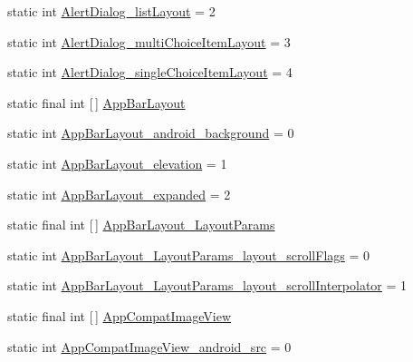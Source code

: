 \begin{DoxyCompactItemize}
static int \hyperlink{classandroid_1_1support_1_1v7_1_1mediarouter_1_1R_1_1styleable_adb558027c7238facf23ec10cef40dce0}{Alert\+Dialog\+\_\+list\+Layout} = 2
\item 
static int \hyperlink{classandroid_1_1support_1_1v7_1_1mediarouter_1_1R_1_1styleable_a1e53127a3d6a2149e6dc386c82e69aaf}{Alert\+Dialog\+\_\+multi\+Choice\+Item\+Layout} = 3
\item 
static int \hyperlink{classandroid_1_1support_1_1v7_1_1mediarouter_1_1R_1_1styleable_adc94f1a936a7816d5ee670490f3f49df}{Alert\+Dialog\+\_\+single\+Choice\+Item\+Layout} = 4
\item 
static final int \mbox{[}$\,$\mbox{]} \hyperlink{classandroid_1_1support_1_1v7_1_1mediarouter_1_1R_1_1styleable_abcffe94741186dacd49a336e4ab2becb}{App\+Bar\+Layout}
\item 
static int \hyperlink{classandroid_1_1support_1_1v7_1_1mediarouter_1_1R_1_1styleable_a60f0ed09c40470debb8059fff6b0777c}{App\+Bar\+Layout\+\_\+android\+\_\+background} = 0
\item 
static int \hyperlink{classandroid_1_1support_1_1v7_1_1mediarouter_1_1R_1_1styleable_a94fe1d4c732eab96a6a39f87b5e7033d}{App\+Bar\+Layout\+\_\+elevation} = 1
\item 
static int \hyperlink{classandroid_1_1support_1_1v7_1_1mediarouter_1_1R_1_1styleable_a7af4ef569f9c7c7a9c4ee947088887d0}{App\+Bar\+Layout\+\_\+expanded} = 2
\item 
static final int \mbox{[}$\,$\mbox{]} \hyperlink{classandroid_1_1support_1_1v7_1_1mediarouter_1_1R_1_1styleable_ad56052828eb14d75ca60a6e450bcbcd5}{App\+Bar\+Layout\+\_\+\+Layout\+Params}
\item 
static int \hyperlink{classandroid_1_1support_1_1v7_1_1mediarouter_1_1R_1_1styleable_a9c61f6843c14b7661616ae4febb6df6e}{App\+Bar\+Layout\+\_\+\+Layout\+Params\+\_\+layout\+\_\+scroll\+Flags} = 0
\item 
static int \hyperlink{classandroid_1_1support_1_1v7_1_1mediarouter_1_1R_1_1styleable_a1c1befc79f0759dda896bed576c263ef}{App\+Bar\+Layout\+\_\+\+Layout\+Params\+\_\+layout\+\_\+scroll\+Interpolator} = 1
\item 
static final int \mbox{[}$\,$\mbox{]} \hyperlink{classandroid_1_1support_1_1v7_1_1mediarouter_1_1R_1_1styleable_a0ce9cb60cf11193ca8edd3c65353bedf}{App\+Compat\+Image\+View}
\item 
static int \hyperlink{classandroid_1_1support_1_1v7_1_1mediarouter_1_1R_1_1styleable_a989859c4889fdb7b7569276cbfdd438e}{App\+Compat\+Image\+View\+\_\+android\+\_\+src} = 0
\item 

\end{DoxyCompactItemize}
